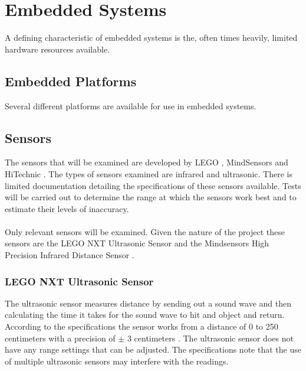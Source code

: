 \section{Embedded Systems}\label{sec:embeddedsystemts}\label{\automlabel}
A defining characteristic of embedded systems is the, often times heavily, limited hardware resources available.
\eal

\subsection{Embedded Platforms}\label{ss:embeddedplatforms}\label{\automlabel}
Several different platforms are available for use in embedded systems.
\eal 

\subsection{Sensors}\label{ss:sensors}\label{\automlabel}
The sensors that will be examined are developed by LEGO \cite{LEGO}, MindSensors \cite{MindSensors} and HiTechnic \cite{hitechnic}. The types of sensors examined are infrared and ultrasonic. There is limited documentation detailing the specifications of these sensors available. Tests will be carried out to determine the range at which the sensors work best and to estimate their levels of inaccuracy. \\\\
\noindent
Only relevant sensors will be examined. Given the nature of the project these sensors are the LEGO NXT Ultrasonic Sensor \cite{legoultrasonic} and the Mindsensors High Precision Infrared Distance Sensor \cite[v3, the tested one is v2]{mindinfrared}.
\eal

\subsubsection{LEGO NXT Ultrasonic Sensor}\label{ss:ultrasonic}\label{\automlabel}
The ultrasonic sensor measures distance by sending out a sound wave and then calculating the time it takes for the sound wave to hit and object and return. According to the specifications the sensor works from a distance of 0 to 250 centimeters with a precision of $\pm$ 3 centimeters \cite[p. 29]{legonxtdata}. The ultrasonic sensor does not have any range settings that can be adjusted. The specifications note that the use of multiple ultrasonic sensors may interfere with the readings. \\

